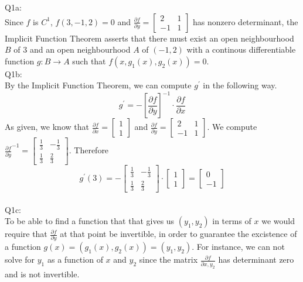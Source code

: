 \documentclass[letterpaper]{article}
\begin{document}
Q1a:\\
Since $f$ is $C^1$, $f(3,-1,2)=0$ and $\frac{\partial f}{\partial y}  = \begin{bmatrix}
    2 & 1 \\ -1 & 1
\end{bmatrix}$ has nonzero determinant, the Implicit Function Theorem asserts that there must exist an open neighbourhood $B$ of $3$ and an open neighbourhood $A$ of $(-1,2)$ with a continous differentiable function $g: B \rightarrow A$ such that $f(x,g_1(x),g_2(x))=0$. 
\\ Q1b: \\
By the Implicit Function Theorem, we can compute $g^\prime$ in the following way. $$g^\prime = - \left[\frac{\partial f}{\partial y}\right] ^{-1} \cdot \frac{\partial f}{\partial x}$$
As given, we know that $\frac{\partial f}{\partial x} = \begin{bmatrix}
    1 \\ 1
\end{bmatrix}$ and $\frac{\partial f}{\partial y} = \begin{bmatrix} 2 & 1 \\ -1 & 1 \end{bmatrix}$. We compute $\frac{\partial f}{\partial y}^{-1} = \begin{bmatrix} \frac{1}{3} & - \frac{1}{3} \\ \frac{1}{3} & \frac{2}{3} \end{bmatrix}$. Therefore 
$$g^\prime(3) = - \begin{bmatrix} \frac{1}{3} & - \frac{1}{3} \\ \frac{1}{3} & \frac{2}{3} \end{bmatrix} \cdot \begin{bmatrix} 1 \\ 1 \end{bmatrix} = \begin{bmatrix} 0 \\ -1 \end{bmatrix}$$
\\ Q1c: \\ To be able to find a function that that gives us $(y_1,y_2)$ in terms of $x$ we would require that $\frac{\partial f}{\partial y}$ at that point be invertible, in order to guarantee the excistence of a function $g(x)= (g_1(x),g_2(x)) = (y_1,y_2)$. For instance, we can not solve for $y_1$ as a function of $x$ and $y_2$ since the matrix $\frac{\partial f}{\partial x,y_2}$ has determinant zero and is not invertible. 
\end{document}
